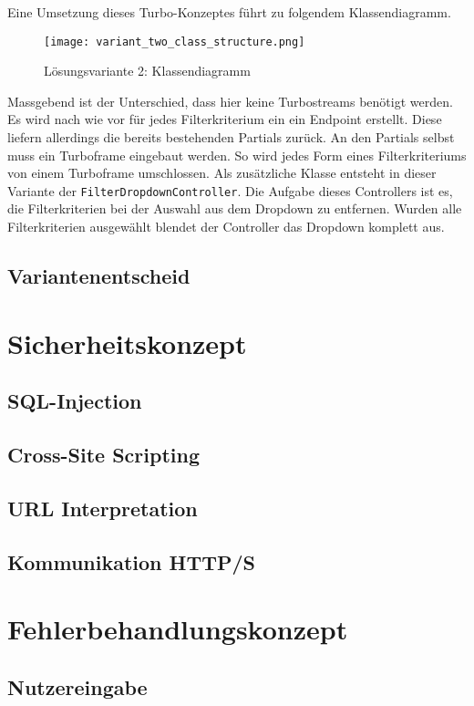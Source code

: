 \newpage

Eine Umsetzung dieses Turbo-Konzeptes führt zu folgendem Klassendiagramm.

\begin{figure}[h]
   \centering
   \texttt{[image: variant\_two\_class\_structure.png]}
   \caption{Lösungsvariante 2: Klassendiagramm}
\end{figure}

Massgebend ist der Unterschied, dass hier keine Turbostreams benötigt werden. Es wird nach wie vor für jedes Filterkriterium ein
ein Endpoint erstellt. Diese liefern allerdings die bereits bestehenden Partials zurück. An den Partials selbst muss ein Turboframe eingebaut werden.
So wird jedes Form eines Filterkriteriums von einem Turboframe umschlossen. Als zusätzliche Klasse entsteht in dieser Variante der \texttt{FilterDropdownController}.
Die Aufgabe dieses Controllers ist es, die Filterkriterien bei der Auswahl aus dem Dropdown zu entfernen. Wurden alle Filterkriterien ausgewählt blendet der Controller das
Dropdown komplett aus. 

\subsection{Variantenentscheid}

\section{Sicherheitskonzept}
\subsection{SQL-Injection}
\subsection{Cross-Site Scripting}
\subsection{URL Interpretation}
\subsection{Kommunikation HTTP/S}

\section{Fehlerbehandlungskonzept}
\subsection{Nutzereingabe}
